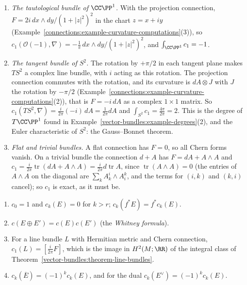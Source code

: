 \begin{example}\label{characteristic-classes:example-chern-forms-sphere}
\begin{enumerate}
\item \emph{The tautological bundle of $\CC\PP^1$.} With the projection connection, $F = 2i\,dx \wedge dy/(1 + |z|^2)^2$ in the chart $z = x + iy$
(Example~\ref{connections:example-curvature-computations}(3)), so $c_1(\mathcal{O}(-1), \nabla) = -\frac1\pi\,dx \wedge dy/(1 + |z|^2)^2$, and $\int_{\CC\PP^1}c_1 = -1$.
\item \emph{The tangent bundle of $S^2$.} The rotation by $+\pi/2$ in each tangent plane makes $TS^2$ a complex line bundle, with $i$ acting as this rotation. The projection
connection commutes with the rotation, and its curvature is $dA \otimes J$ with $J$ the rotation by $-\pi/2$ (Example~\ref{connections:example-curvature-computations}(2)), that is
$F = -i\,dA$ as a complex $1 \times 1$ matrix. So $c_1(TS^2, \nabla) = \frac{i}{2\pi}(-i)\,dA = \frac{1}{2\pi}dA$ and $\int_{S^2}c_1 = \frac{4\pi}{2\pi} = 2$. This is the degree of
$T\CC\PP^1$ found in Example~\ref{vector-bundles:example-degrees}(2), and the Euler characteristic of $S^2$: the Gauss--Bonnet theorem.
\item \emph{Flat and trivial bundles.} A flat connection has $F = 0$, so all Chern forms vanish. On a trivial bundle the connection $d + A$ has $F = dA + A \wedge A$ and
$c_1 = \frac{i}{2\pi}\operatorname{tr}(dA + A \wedge A) = \frac{i}{2\pi}d\operatorname{tr}A$, since $\operatorname{tr}(A \wedge A) = 0$ (the entries of $A \wedge A$ on the diagonal are
$\sum_kA^i_k \wedge A^k_i$, and the terms for $(i, k)$ and $(k, i)$ cancel); so $c_1$ is exact, as it must be.
\end{enumerate}
\end{example}

\begin{proposition}\label{characteristic-classes:proposition-chern-properties}
\begin{enumerate}
\item $c_0 = 1$ and $c_k(E) = 0$ for $k > r$; $c_k(f^*E) = f^*c_k(E)$.
\item $c(E \oplus E') = c(E)c(E')$ (the \emph{Whitney formula}).
\item For a line bundle $L$ with Hermitian metric and Chern connection, $c_1(L) = [\frac{i}{2\pi}F]$, which is the image in $H^2(M; \RR)$ of the integral class of
Theorem~\ref{vector-bundles:theorem-line-bundles}.
\item $c_k(\overline{E}) = (-1)^kc_k(E)$, and for the dual $c_k(E^\vee) = (-1)^kc_k(E)$.
\end{enumerate}
\end{proposition}

